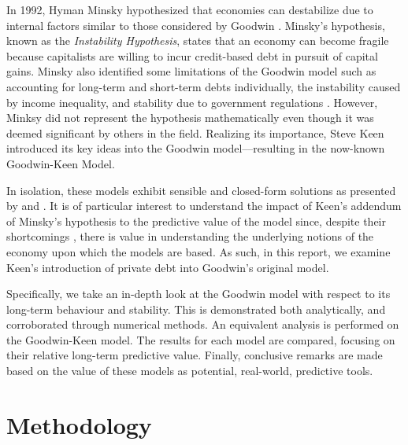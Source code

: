 \documentclass[12pt, centerh1]{article}
\begin{document}
\noindent In 1992, Hyman Minsky hypothesized that economies can destabilize due to internal factors similar to those considered by Goodwin \citep{minsky1992financial}. Minsky's hypothesis, known as the \emph{Instability Hypothesis}, states that an economy can become fragile because capitalists are willing to incur credit-based debt in pursuit of capital gains. Minsky also identified some limitations of the Goodwin model such as accounting for long-term and short-term debts individually, the instability caused by income inequality, and stability due to government regulations \citep{minsky1992financial}. However, Minksy did not represent the hypothesis mathematically even though it was deemed significant by others in the field. Realizing its importance, Steve Keen \citep{keen1995finance} introduced its key ideas into the Goodwin model––resulting in the now-known Goodwin-Keen Model. 

\noindent In isolation, these models exhibit sensible and closed-form solutions as presented by \citet{goodwin1982growth} and \citet{grasselli2012analysis}. It is of particular interest to understand the impact of Keen's addendum of Minsky's hypothesis to the predictive value of the model since, despite their shortcomings \citep{harvie2000testing, moura2013testing}, there is value in understanding the underlying notions of the economy upon which the models are based. As such, in this report, we examine Keen's introduction of private debt into Goodwin's original model.

\noindent Specifically, we take an in-depth look at the Goodwin model with respect to its long-term behaviour and stability. This is demonstrated both analytically, and corroborated through numerical methods. An equivalent analysis is performed on the Goodwin-Keen model. The results for each model are compared, focusing on their relative long-term predictive value. Finally, conclusive remarks are made based on the value of these models as potential, real-world, predictive tools.


\section{Methodology}
\end{document}
